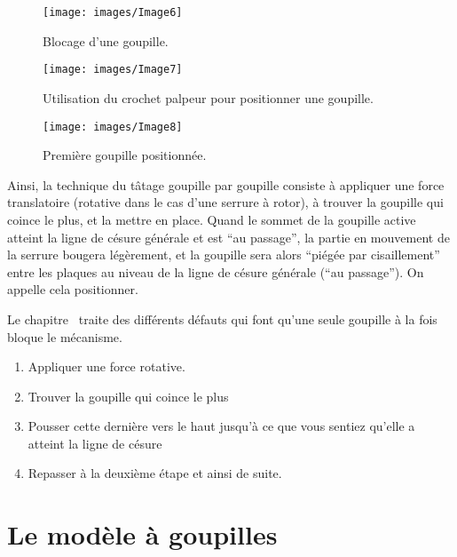 \documentclass[a4paper,french,11pt,twoside]{report}
\begin{document}
\begin{figure}[ht]
  \begin{center}
    \texttt{[image: images/Image6]}
    \caption{Blocage d'une goupille.\label{blocage_goupille}}
  \end{center}
\end{figure}

\begin{figure}[ht]
  \begin{center}
    \texttt{[image: images/Image7]}
    \caption{Utilisation du crochet palpeur pour positionner une goupille.\label{crochet_goupille}}
  \end{center}
\end{figure}

\begin{figure}[ht]
  \begin{center}
    \texttt{[image: images/Image8]}
    \caption{Première goupille positionnée.\label{goupille_positionnee}}
  \end{center}
\end{figure}


Ainsi, la technique du tâtage goupille par goupille consiste à appliquer une force translatoire (rotative dans le cas d'une serrure à rotor), à trouver la goupille qui coince le plus, et la mettre en place. Quand le sommet de la goupille active atteint la ligne de césure générale et est \enquote{au passage}, la partie en mouvement de la serrure bougera légèrement, et la goupille sera alors \enquote{piégée par cisaillement} entre les plaques au niveau de la ligne de césure générale (\enquote{au passage}). On appelle cela positionner.

Le chapitre~ traite des différents défauts qui font qu'une seule goupille à la fois bloque le mécanisme.

\begin{enumerate}
    \item{Appliquer une force rotative.}
    \item{Trouver la goupille qui coince le plus}
    \item{Pousser cette dernière vers le haut jusqu'à ce que vous sentiez qu'elle a atteint la ligne de césure}
    \item{Repasser à la deuxième étape et ainsi de suite. }
\end{enumerate}

\chapter{\label{chap:modele_goupilles}Le modèle à goupilles}
\end{document}
